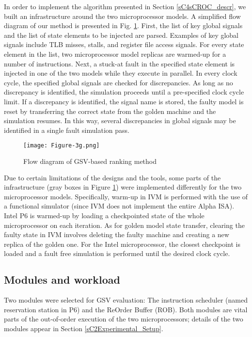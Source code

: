 \documentclass[12pt]{yalephd}
\begin{document}
In order to implement the algorithm presented in Section \ref{sC4sCROC_descr}, we built an infrastructure around the two microprocessor models. A simplified flow diagram of our method is presented in Fig. \ref{sC4fCrocflow}. First, the list of key global signals and the list of state elements to be injected are parsed. Examples of key global signals include TLB misses, stalls, and register file access signals. For every state element in the list, two microprocessor model replicas are warmed-up for a number of instructions. Next, a stuck-at fault in the specified state element is injected in one of the two models while they execute in parallel. In every clock cycle, the specified global signals are checked for discrepancies. As long as no discrepancy is identified, the simulation proceeds until a pre-specified clock cycle limit. If a discrepancy is identified, the signal name is stored, the faulty model is reset by transferring the correct state from the golden machine and the simulation resumes. In this way, several discrepancies in global signals may be identified in a single fault simulation pass.

\begin{figure}[!ht]
\centering
\texttt{[image: Figure-3g.png]}
\caption{Flow diagram of GSV-based ranking method}
\label{sC4fCrocflow}
\end{figure}

Due to certain limitations of the designs and the tools, some parts of the infrastructure (gray boxes in Figure \ref{sC4fCrocflow}) were implemented differently for the two microprocessor models. Specifically, warm-up in IVM is performed with the use of a functional simulator (since IVM does not implement the entire Alpha ISA). Intel P6 is warmed-up by loading a checkpointed state of the whole microprocessor on each iteration. As for golden model state transfer, clearing the faulty state in IVM involves deleting the faulty machine and creating a new replica of the golden one. For the Intel microprocessor, the closest checkpoint is loaded and a fault free simulation is performed until the desired clock cycle.

\subsection{Modules and workload}

Two modules were selected for GSV evaluation: The instruction scheduler (named reservation station in P6) and the ReOrder Buffer (ROB). Both modules are vital parts of the out-of-order execution of the two microprocessors; details of the two modules appear in Section \ref{sC2Experimental_Setup}.
\end{document}
